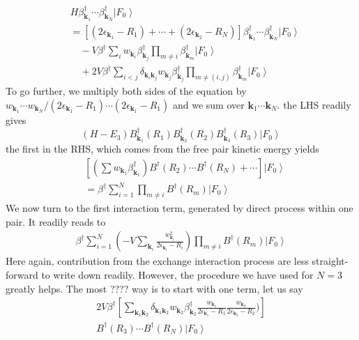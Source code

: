 \documentclass[aps,prb,superscriptaddress,showpacs,reprint,lengthcheck]{revtex4-1}
\newcommand{\vk}{\ensuremath{\mathbf{k}}}
\begin{document}
\begin{equation}\label{eq:HN2}
\begin{split}
&H\beta^{\dagger}_{\mathbf{k} _1}\cdots\beta^{\dagger}_{\mathbf{k}
_N}\left|F_0\right> \\
&=[(2\epsilon_{\vk_1}-R_1)+\cdots+(2\epsilon_{\vk_2}-R_N)]\beta^\dagger_{\vk_1}\cdots\beta^\dagger_{\vk_N}\left|F_0\right>  \\
&\quad-V\beta^\dagger \sum_{i}w_{\vk_i}\beta^\dagger_{\vk_j}\prod_{m\neq{}i}\beta^{\dagger}_{\mathbf{k} _m} \left|F_0\right>  \\
&\quad+2V\beta^\dagger\sum_{i<j}\delta_{\vk_i\vk_j}w_{\vk_j}\beta^\dagger_{\vk_j}\prod_{m\neq(i,j)}\beta^{\dagger}_{\mathbf{k} _m} \left|F_0\right>  
\end{split}
\end{equation}
To go further, we multiply both sides of the equation by $w_{\vk_1}\cdots{}w_{\vk_N}/(2\epsilon_{\vk_1}-R_1)\cdots(2\epsilon_{\vk_1}-R_1)$ and we sum over $\vk_1\cdots\vk_N$.  the LHS readily gives
\begin{equation}
(H-E _3)B^{\dagger}_{\mathbf{k} _1}(R_1)B^{\dagger}_{\mathbf{k}
_2}(R_2)B^{\dagger}_{\mathbf{k} _3}(R_3)\left|F_0\right> 
\end{equation}
the first in the RHS, which comes from the free pair kinetic energy yields
\begin{equation}
\begin{split}
&[(\sum{}w_{\vk_1}\beta^\dagger_{\vk_1})B^\dagger(R_2)\cdots{}B^\dagger(R_N)+\cdots]\left|F_0\right>\\
&=\beta^\dagger\sum_{i=1}^N\prod_{m\neq{i}}B^\dagger(R_m)\left|F_0\right> 
\end{split}
\end{equation}
We now turn to the first interaction term, generated by direct process within one pair.  It readily reads to 
\begin{equation}
\begin{split}
\beta^\dagger\sum_{i=1}^N(-V\sum_{\vk_i}\frac{w_{\mathbf{k} _i}^2}{2\epsilon_{\mathbf{k} _i}-R_i})\prod_{m\neq{i}}B^\dagger(R_m)\left|F_0\right> 
\end{split}
\end{equation}
Here again, contribution from the exchange interaction process are less straight-forward to write down readily.  However, the procedure we have used for $N=3$ greatly helps.  The most ???? way is to start with one term, let us say 
\begin{equation}
\begin{split}
2V\beta^\dagger[\sum_{\vk_1\vk_2}\delta_{\vk_1\vk_2}w_{\vk_2}\beta^\dagger_{\vk_2}\frac{w_{\mathbf{k} _1}}{2\epsilon_{\mathbf{k} _1}-R_1}\frac{w_{\mathbf{k} _2}}{2\epsilon_{\mathbf{k} _2}-R_2})]\\B^\dagger(R_3)\cdots{}B^\dagger(R_N)\left|F_0\right> 
\end{split}
\end{equation}
\end{document}

